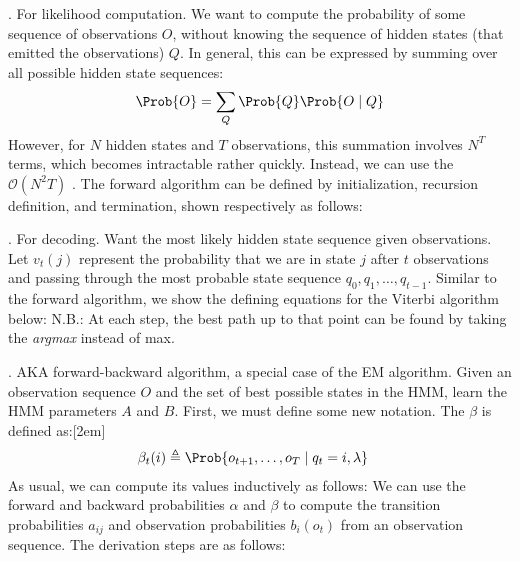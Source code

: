 \documentclass[11pt]{article}
\newcommand\myspace[1][]{\vspace{#1\bigskipamount}}
\newcommand\p{\Needspace{10\baselineskip} \noindent}
\begin{document}
\myspace
\p {}. For likelihood computation. We want to compute the probability of some sequence of observations $O$, without knowing the sequence of hidden states (that emitted the observations) $Q$. In general, this can be expressed by summing over all possible hidden state sequences:
\begin{align}
	\Prob{O} = \sum_Q \Prob{Q} \Prob{O \mid Q} 
\end{align}
However, for $N$ hidden states and $T$ observations, this summation involves $N^T$ terms, which becomes intractable rather quickly. Instead, we can use the $\mathcal{O}(N^2 T)$ . The forward algorithm can be defined by initialization, recursion definition, and termination, shown respectively as follows:


\myspace
\p {}. For decoding. Want the most likely hidden state sequence given observations. Let $v_t(j)$ represent the probability that we are in state $j$ after $t$ observations and passing through the most probable state sequence $q_0,q_1,\ldots,q_{t-1}$. Similar to the forward algorithm, we show the defining equations for the Viterbi algorithm below:
N.B.: At each step, the best path up to that point can be found by taking the \textit{argmax} instead of max. 

\myspace
\p {}. AKA forward-backward algorithm, a special case of the EM algorithm. Given an observation sequence $O$ and the set of best possible states in the HMM, learn the HMM parameters $A$ and $B$. First, we must define some new notation. The  $\beta$ is defined as:[2em]
\begin{align}
	\beta_t(i) &\triangleq \Prob{o_{t + 1}, \ldots, o_T \mid q_t = i, \lambda}
\end{align}
As usual, we can compute its values inductively as follows:
We can use the forward and backward probabilities $\alpha$ and $\beta$ to compute the transition probabilities $a_{ij}$ and observation probabilities $b_i(o_t)$ from an observation sequence. The derivation steps are as follows:
\end{document}
